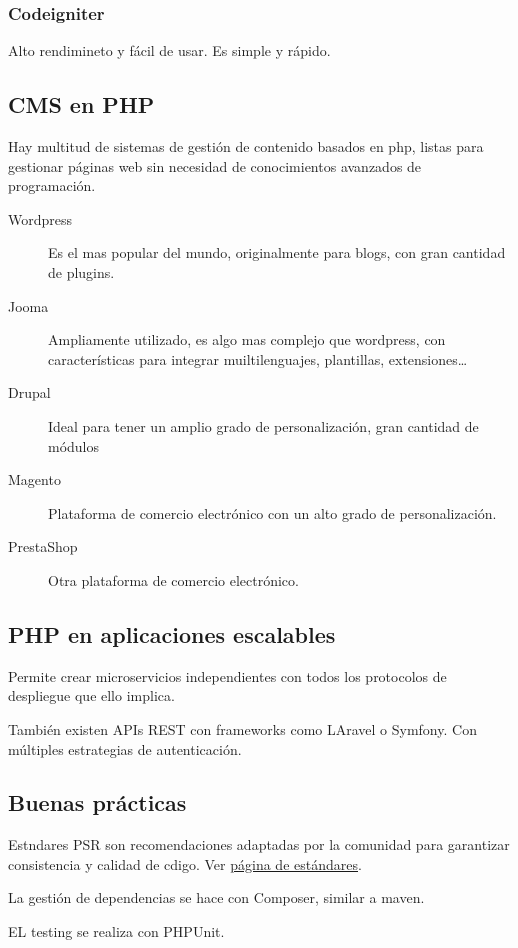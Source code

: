     \subsubsection{Codeigniter}
        Alto rendimineto y fácil de usar. Es simple y rápido.

\subsection{CMS en PHP}
    Hay multitud de sistemas de gestión de contenido basados en php, listas para gestionar páginas web sin necesidad de conocimientos avanzados de programación.

    \begin{description}
        \item[Wordpress] Es el mas popular del mundo, originalmente para blogs, con gran cantidad de plugins.
        \item[Jooma] Ampliamente utilizado, es algo mas complejo que wordpress, con características para integrar muiltilenguajes, plantillas, extensiones\dots
        \item[Drupal] Ideal para tener un amplio grado de personalización, gran cantidad de módulos
        \item[Magento] Plataforma de comercio electrónico con un alto grado de personalización.
        \item[PrestaShop] Otra plataforma de comercio electrónico.
    \end{description}

\subsection{PHP en aplicaciones escalables}
    Permite crear microservicios independientes con todos los protocolos de despliegue que ello implica. 

    También existen APIs REST con frameworks como LAravel o Symfony. Con múltiples estrategias de autenticación. 

\subsection{Buenas prácticas}
    Estndares PSR son recomendaciones adaptadas por la comunidad para garantizar consistencia y calidad de cdigo. Ver \href{https://www.php-fig.org/psr/}{página de estándares}.

    La gestión de dependencias se hace con Composer, similar a maven.

    EL testing se realiza con PHPUnit.
